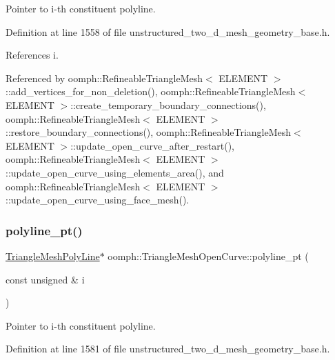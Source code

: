 Pointer to i-\/th constituent polyline. 



Definition at line 1558 of file unstructured\+\_\+two\+\_\+d\+\_\+mesh\+\_\+geometry\+\_\+base.\+h.



References i.



Referenced by oomph\+::\+Refineable\+Triangle\+Mesh$<$ E\+L\+E\+M\+E\+N\+T $>$\+::add\+\_\+vertices\+\_\+for\+\_\+non\+\_\+deletion(), oomph\+::\+Refineable\+Triangle\+Mesh$<$ E\+L\+E\+M\+E\+N\+T $>$\+::create\+\_\+temporary\+\_\+boundary\+\_\+connections(), oomph\+::\+Refineable\+Triangle\+Mesh$<$ E\+L\+E\+M\+E\+N\+T $>$\+::restore\+\_\+boundary\+\_\+connections(), oomph\+::\+Refineable\+Triangle\+Mesh$<$ E\+L\+E\+M\+E\+N\+T $>$\+::update\+\_\+open\+\_\+curve\+\_\+after\+\_\+restart(), oomph\+::\+Refineable\+Triangle\+Mesh$<$ E\+L\+E\+M\+E\+N\+T $>$\+::update\+\_\+open\+\_\+curve\+\_\+using\+\_\+elements\+\_\+area(), and oomph\+::\+Refineable\+Triangle\+Mesh$<$ E\+L\+E\+M\+E\+N\+T $>$\+::update\+\_\+open\+\_\+curve\+\_\+using\+\_\+face\+\_\+mesh().

\mbox{\label{classoomph_1_1TriangleMeshOpenCurve_a51f6862e7ce4a37df206442999f3dd47}} 
\subsubsection{\texorpdfstring{polyline\+\_\+pt()}{polyline\_pt()}\hspace{0.1cm}{\footnotesize\ttfamily [2/2]}}
{\footnotesize\ttfamily \hyperlink{classoomph_1_1TriangleMeshPolyLine}{Triangle\+Mesh\+Poly\+Line}$\ast$ oomph\+::\+Triangle\+Mesh\+Open\+Curve\+::polyline\+\_\+pt (\begin{DoxyParamCaption}\item[{const unsigned \&}]{i }\end{DoxyParamCaption})\hspace{0.3cm}{\ttfamily [inline]}}



Pointer to i-\/th constituent polyline. 



Definition at line 1581 of file unstructured\+\_\+two\+\_\+d\+\_\+mesh\+\_\+geometry\+\_\+base.\+h.



